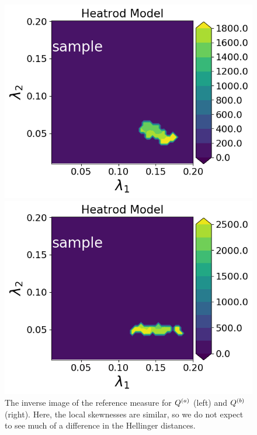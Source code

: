 \begin{figure}[h]
\begin{minipage}{.475\textwidth}
\includegraphics[width=\linewidth]{examples/fig_heatrod_q1/tHeatrodModel--sample_N500_mc.png}
\end{minipage}
\begin{minipage}{.475\textwidth}
\includegraphics[width=\linewidth]{examples/fig_heatrod_q2/tHeatrodModel--sample_N500_mc.png}
\end{minipage}
\caption{The inverse image of the reference measure for $Q^{(a)}$ (left) and $Q^{(b)}$ (right). Here, the local skewnesses are similar, so we do not expect to see much of a difference in the Hellinger distances.}
\label{fig:NLtopmid}
\end{figure}

